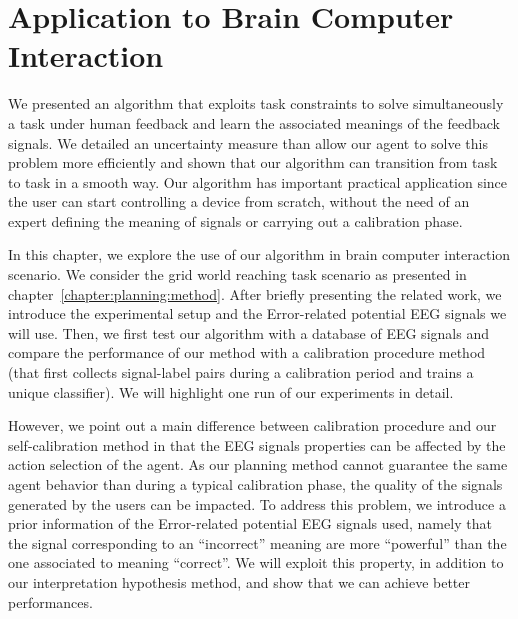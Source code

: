 
\chapter{Application to Brain Computer Interaction}
\label{chapter:bci}
\minitoc


We presented an algorithm that exploits task constraints to solve simultaneously a task under human feedback and learn the associated meanings of the feedback signals. We detailed an uncertainty measure than allow our agent to solve this problem more efficiently and shown that our algorithm can transition from task to task in a smooth way. Our algorithm has important practical application since the user can start controlling a device from scratch, without the need of an expert defining the meaning of signals or carrying out a calibration phase. 

In this chapter, we explore the use of our algorithm in brain computer interaction scenario. We consider the grid world reaching task scenario as presented in chapter~\ref{chapter:planning:method}. After briefly presenting the related work, we introduce the experimental setup and the Error-related potential EEG signals we will use. Then, we first test our algorithm with a database of EEG signals and compare the performance of our method with a calibration procedure method (that first collects signal-label pairs during a calibration period and trains a unique classifier). We will highlight one run of our experiments in detail.


However, we point out a main difference between calibration procedure and our self-calibration method in that the EEG signals properties can be affected by the action selection of the agent. As our planning method cannot guarantee the same agent behavior than during a typical calibration phase, the quality of the signals generated by the users can be impacted. To address this problem, we introduce a prior information of the Error-related potential EEG signals used, namely that the signal corresponding to an ``incorrect'' meaning are more ``powerful'' than the one associated to meaning ``correct''. We will exploit this property, in addition to our interpretation hypothesis method, and show that we can achieve better performances. 

